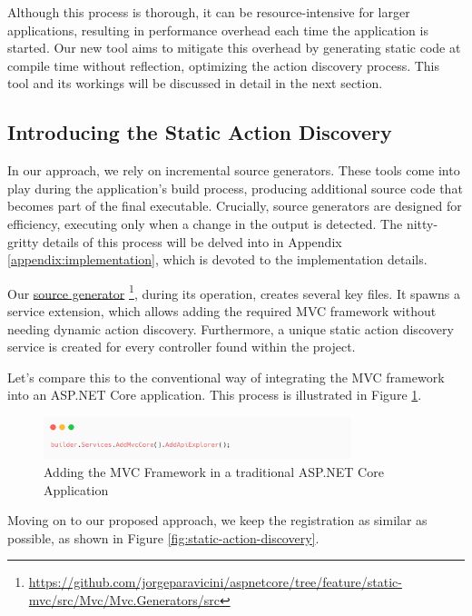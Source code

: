 Although this process is thorough, it can be resource-intensive for larger applications, resulting in performance overhead each time the application is started. Our new tool aims to mitigate this overhead by generating static code at compile time without reflection, optimizing the action discovery process. This tool and its workings will be discussed in detail in the next section.

\subsection{Introducing the Static Action Discovery}

In our approach, we rely on incremental source generators. These tools come into play during the application's build process, producing additional source code that becomes part of the final executable. Crucially, source generators are designed for efficiency, executing only when a change in the output is detected. The nitty-gritty details of this process will be delved into in Appendix \ref{appendix:implementation}, which is devoted to the implementation details.

Our \href{https://github.com/jorgeparavicini/aspnetcore/tree/feature/static-mvc/src/Mvc/Mvc.Generators/src}{source generator} \footnote{\url{https://github.com/jorgeparavicini/aspnetcore/tree/feature/static-mvc/src/Mvc/Mvc.Generators/src}}, during its operation, creates several key files. It spawns a service extension, which allows adding the required MVC framework without needing dynamic action discovery. Furthermore, a unique static action discovery service is created for every controller found within the project.

Let's compare this to the conventional way of integrating the MVC framework into an ASP.NET Core application. This process is illustrated in Figure \ref{fig:dynamic-action-discovery}.

\begin{figure}[H]
\centering
\includegraphics[width=0.8\textwidth]{graphics/dynamic-action-discovery.png}
\caption{Adding the MVC Framework in a traditional ASP.NET Core Application}
\label{fig:dynamic-action-discovery}
\end{figure}

Moving on to our proposed approach, we keep the registration as similar as possible, as shown in Figure \ref{fig:static-action-discovery}.


